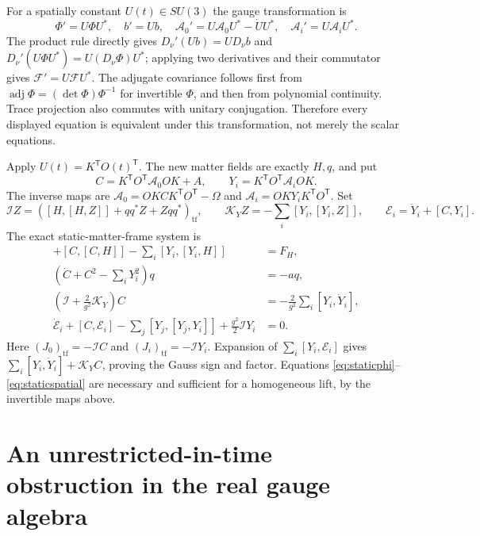 \documentclass[11pt]{article}
\newcommand{\tf}{\mathrm{tf}}
\begin{document}
For a spatially constant $U(t)\in SU(3)$ the gauge transformation is
\[
 \Phi'=U\Phi U^*,\quad b'=Ub,\quad
 \mathcal A_0'=U\mathcal A_0U^*-\dot U U^*,\quad
 \mathcal A_i'=U\mathcal A_iU^*.
\]
The product rule directly gives
$D_\nu'(U b)=U D_\nu b$ and
$D_\nu'(U\Phi U^*)=U(D_\nu\Phi)U^*$; applying two derivatives and
their commutator gives $\mathcal F'=U\mathcal F U^*$.
The adjugate covariance follows first from
$\operatorname{adj}\Phi=(\det\Phi)\Phi^{-1}$ for invertible $\Phi$,
and then from polynomial continuity. Trace projection also commutes with
unitary conjugation. Therefore every displayed equation is equivalent
under this transformation, not merely the scalar equations.

Apply $U(t)=K^{\mathsf T}O(t)^{\mathsf T}$. The new matter fields are
exactly $H,q$, and put
\begin{equation}\label{eq:framemap}
 C=K^{\mathsf T}O^{\mathsf T}\mathcal A_0OK+A,\qquad
 Y_i=K^{\mathsf T}O^{\mathsf T}\mathcal A_iOK.
\end{equation}
The inverse maps are
$\mathcal A_0=OKCK^{\mathsf T}O^{\mathsf T}-\Omega$ and
$\mathcal A_i=OKY_iK^{\mathsf T}O^{\mathsf T}$.
Set
\[
 \mathcal I Z=([H,[H,Z]]+qq^*Z+Zqq^*)_{\tf},\qquad
 \mathcal K_YZ=-\sum_i[Y_i,[Y_i,Z]],\qquad
 \mathcal E_i=\dot Y_i+[C,Y_i].
\]
The exact static-matter-frame system is
\begin{align}
 [\dot C,H]+[C,[C,H]]-\sum_i[Y_i,[Y_i,H]]&=F_H,\label{eq:staticphi}\\
 (\dot C+C^2-\sum_iY_i^2)q&=-aq,\label{eq:staticb}\\
 \left(\mathcal I+\frac2{g^2}\mathcal K_Y\right)C
       &=-\frac2{g^2}\sum_i[Y_i,\dot Y_i],\label{eq:staticgauss}\\
 \dot{\mathcal E}_i+[C,\mathcal E_i]
 -\sum_j[Y_j,[Y_j,Y_i]]+\frac{g^2}{2}\mathcal I Y_i&=0.
 \label{eq:staticspatial}
\end{align}
Here $(J_0)_{\tf}=-\mathcal I C$ and $(J_i)_{\tf}=-\mathcal I Y_i$.
Expansion of $\sum_i[Y_i,\mathcal E_i]$ gives
$\sum_i[Y_i,\dot Y_i]+\mathcal K_Y C$, proving the Gauss sign and factor.
Equations \eqref{eq:staticphi}--\eqref{eq:staticspatial} are necessary
and sufficient for a homogeneous lift, by the invertible maps above.

\section{An unrestricted-in-time obstruction in the real gauge algebra}
\end{document}
